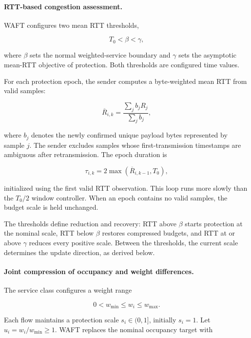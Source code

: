 \paragraph{RTT-based congestion assessment.}

WAFT configures two mean RTT thresholds,

\begin{equation}
\label{eq:design-28}
T_0<\beta<\gamma,
\end{equation}

where \(\beta\) sets the normal weighted-service boundary and \(\gamma\) sets the asymptotic mean-RTT objective of protection. Both thresholds are configured time values.

For each protection epoch, the sender computes a byte-weighted mean RTT from valid samples:

\begin{equation}
\label{eq:design-29}
\overline R_{i,k}
=
\frac{\sum_j b_jR_j}{\sum_jb_j},
\end{equation}

where \(b_j\) denotes the newly confirmed unique payload bytes represented by sample \(j\). The sender excludes samples whose first-transmission timestamps are ambiguous after retransmission. The epoch duration is

\begin{equation}
\label{eq:design-30}
\tau_{i,k}
=
2\max(\overline R_{i,k-1},T_0),
\end{equation}

initialized using the first valid RTT observation. This loop runs more slowly than the \(T_0/2\) window controller. When an epoch contains no valid samples, the budget scale is held unchanged.

The thresholds define reduction and recovery: RTT above \(\beta\) starts protection at the nominal scale, RTT below \(\beta\) restores compressed budgets, and RTT at or above \(\gamma\) reduces every positive scale. Between the thresholds, the current scale determines the update direction, as derived below.

\paragraph{Joint compression of occupancy and weight differences.}

The service class configures a weight range

\[
0<w_{\min}\le w_i\le w_{\max}.
\]

Each flow maintains a protection scale \(s_i\in(0,1]\), initially \(s_i=1\). Let \(u_i=w_i/w_{\min}\ge1\). WAFT replaces the nominal occupancy target with

